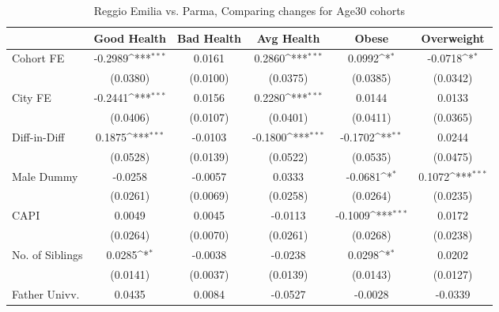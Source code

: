 \begin{table}[htbp]\centering
\def\sym#1{\ifmmode^{#1}\else\(^{#1}\)\fi}
\caption{Reggio Emilia vs. Parma, Comparing changes for Age30 cohorts}
\begin{tabular}{l*{5}{c}}
\toprule
            &\multicolumn{1}{c}{Good Health}&\multicolumn{1}{c}{Bad Health}&\multicolumn{1}{c}{Avg Health}&\multicolumn{1}{c}{Obese}&\multicolumn{1}{c}{Overweight}\\
\midrule
Cohort FE   &     -0.2989\sym{***}&      0.0161         &      0.2860\sym{***}&      0.0992\sym{*}  &     -0.0718\sym{*}  \\
            &    (0.0380)         &    (0.0100)         &    (0.0375)         &    (0.0385)         &    (0.0342)         \\
\addlinespace
City FE     &     -0.2441\sym{***}&      0.0156         &      0.2280\sym{***}&      0.0144         &      0.0133         \\
            &    (0.0406)         &    (0.0107)         &    (0.0401)         &    (0.0411)         &    (0.0365)         \\
\addlinespace
Diff-in-Diff&      0.1875\sym{***}&     -0.0103         &     -0.1800\sym{***}&     -0.1702\sym{**} &      0.0244         \\
            &    (0.0528)         &    (0.0139)         &    (0.0522)         &    (0.0535)         &    (0.0475)         \\
\addlinespace
Male Dummy  &     -0.0258         &     -0.0057         &      0.0333         &     -0.0681\sym{*}  &      0.1072\sym{***}\\
            &    (0.0261)         &    (0.0069)         &    (0.0258)         &    (0.0264)         &    (0.0235)         \\
\addlinespace
CAPI        &      0.0049         &      0.0045         &     -0.0113         &     -0.1009\sym{***}&      0.0172         \\
            &    (0.0264)         &    (0.0070)         &    (0.0261)         &    (0.0268)         &    (0.0238)         \\
\addlinespace
No. of Siblings&      0.0285\sym{*}  &     -0.0038         &     -0.0238         &      0.0298\sym{*}  &      0.0202         \\
            &    (0.0141)         &    (0.0037)         &    (0.0139)         &    (0.0143)         &    (0.0127)         \\
\addlinespace
Father Univv.&      0.0435         &      0.0084         &     -0.0527         &     -0.0028         &     -0.0339         \\

\end{tabular}
\end{table}
